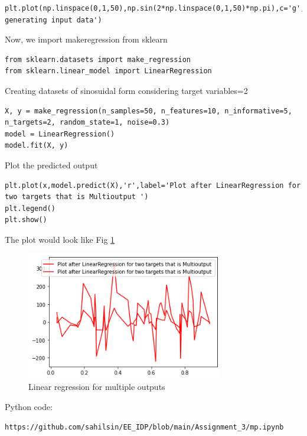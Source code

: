 \documentclass[journal,12pt,twocolumn]{IEEEtran}
\begin{document}
\begin{lstlisting}
plt.plot(np.linspace(0,1,50),np.sin(2*np.linspace(0,1,50)*np.pi),c='g',linewidth=2,label='function generating input data')
\end{lstlisting} 
Now, we import make\textunderscore regression from sklearn
\begin{lstlisting}
from sklearn.datasets import make_regression
from sklearn.linear_model import LinearRegression
\end{lstlisting}
Creating datasets of sinosuidal form considering target variables=2
\begin{lstlisting}
X, y = make_regression(n_samples=50, n_features=10, n_informative=5, n_targets=2, random_state=1, noise=0.3)
model = LinearRegression()
model.fit(X, y)
\end{lstlisting}
Plot the predicted output
\begin{lstlisting}
plt.plot(x,model.predict(X),'r',label='Plot after LinearRegression for two targets that is Multioutput ')
plt.legend()
plt.show()
\end{lstlisting}
The plot would look like Fig \ref{fig:2}
\begin{figure}[!h]
\begin{center}
\includegraphics[width=3.4in]{figs/x2.png}
\end{center}
\caption{Linear regression for multiple outputs}
\label{fig:2}
\end{figure}
Python code:
\begin{lstlisting}
https://github.com/sahilsin/EE_IDP/blob/main/Assignment_3/mp.ipynb
\end{lstlisting}
\end{document}
